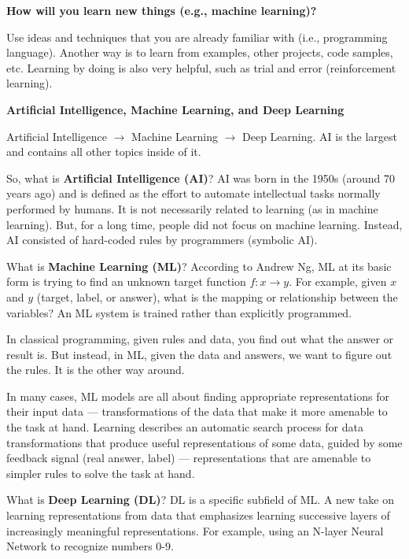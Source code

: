 {\textbf{How will you learn new things (e.g., machine learning)?}
\vspace{11pt}

Use ideas and techniques that you are already familiar with (i.e., programming language). Another way is to learn from examples, other projects, code samples, etc. Learning by doing is also very helpful, such as trial and error (reinforcement learning).

\vspace{11pt}
\textbf{Artificial Intelligence, Machine Learning, and Deep Learning}
\vspace{11pt}

Artificial Intelligence $\to$ Machine Learning $\to$ Deep Learning. AI is the largest and contains all other topics inside of it.

\vspace{11pt}
So, what is \textbf{Artificial Intelligence (AI)}? AI was born in the 1950s (around 70 years ago) and is defined as the effort to automate intellectual tasks normally performed by humans. It is not necessarily related to learning (as in machine learning). But, for a long time, people did not focus on machine learning. Instead, AI consisted of hard-coded rules by programmers (symbolic AI). 

\vspace{11pt}
What is \textbf{Machine Learning (ML)}? According to Andrew Ng, ML at its basic form is trying to find an unknown target function $f: x \to y$. For example, given $x$ and $y$ (target, label, or answer), what is the mapping or relationship between the variables? An ML system is trained rather than explicitly programmed. 

In classical programming, given rules and data, you find out what the answer or result is. But instead, in ML, given the data and answers, we want to figure out the rules. It is the other way around.

In many cases, ML models are all about finding appropriate representations for their input data --- transformations of the data that make it more amenable to the task at hand. Learning describes an automatic search process for data transformations that produce useful representations of some data, guided by some feedback signal (real answer, label) --- representations that are amenable to simpler rules to solve the task at hand.

\vspace{11pt}
What is \textbf{Deep Learning (DL)}? DL is a specific subfield of ML. A new take on learning representations from data that emphasizes learning successive layers of increasingly meaningful representations. For example, using an N-layer Neural Network to recognize numbers 0-9.

}
